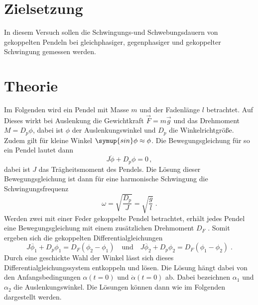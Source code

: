 \section{Zielsetzung}
In diesem Versuch sollen die Schwingungs-und Schwebungsdauern von
gekoppelten Pendeln bei gleichphasiger, gegenphasiger und gekoppelter
Schwingung gemessen werden.
\section{Theorie}
\label{sec:Theorie}
Im Folgenden wird ein Pendel mit Masse $m$ und der Fadenlänge $l$
betrachtet. Auf Dieses wirkt bei Auslenkung die Gewichtkraft $\vec{F} = m\vec{g}$
und das Drehmoment $ M = D_p \phi $, dabei ist $\phi$ der Auslenkungswinkel
und $D_p$ die Winkelrichtgröße. Zudem gilt für kleine Winkel $\symup{sin}\phi
\approx \phi$. Die Bewegungsgleichung für so ein Pendel lautet dann
\begin{equation*}
  J \ddot{\phi} + D_p \phi = 0\, ,
\end{equation*}
dabei ist $J$ das Trägheitsmoment des Pendels. Die Lösung dieser Bewegungsgleichung
ist dann für eine harmonische Schwingung die Schwingungsfrequenz
\begin{equation}
  \omega = \sqrt{\frac{D_p}{J}} = \sqrt{\frac{g}{l}}\;.
  \label{eqn:l1}
\end{equation}
Werden zwei mit einer Feder gekoppelte Pendel betrachtet,
erhält jedes Pendel eine Bewegungsgleichung
mit einem zusätzlichen Drehmoment $D_F$ . Somit ergeben sich die gekoppelten
Differentialgleichungen
\begin{equation*}
J \ddot{\phi_1} + D_p \phi_1 = D_F( \phi_2 - \phi_1) \quad \text{und} \quad
J \ddot{\phi_2} + D_p \phi_2 = D_F( \phi_1 - \phi_2)\;.
\end{equation*}
Durch eine geschickte Wahl der Winkel lässt sich dieses
Differentialgleichungssystem entkoppeln und lösen. Die Lösung hängt dabei von
den Anfangsbedingungen $\alpha(t=0)$ und $\dot{\alpha}(t=0)$ ab. Dabei bezeichnen
$\alpha_1$ und $\alpha_2$ die Auslenkungswinkel.
Die Lösungen können dann wie im Folgenden dargestellt werden.
